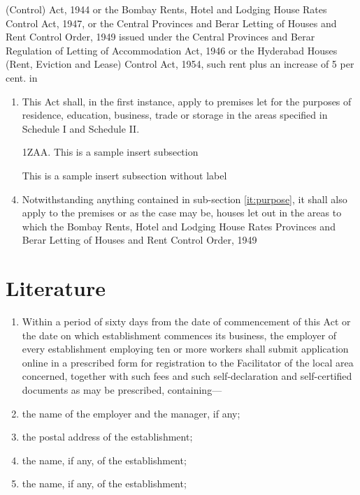 \documentclass[default]{report}
\newcommand{\ins}[1]{\underline{#1}}
\newcommand{\del}[1]{[#1]}
\newcommand{\subs}[2]{\del{#1} \ins{#2}}
\newcommand{\lblitem}[1]{%
  \def\lblnum{#1} \item
}
\newenvironment{subsectionlist}[1][99]{%
  \begin{enumerate}[label=(\emph{\protect\lblnum)}]
    \settowidth{\leftmargin}{#1}
  }{\end{enumerate}}
\begin{document}
(Control) Act, 1944 or the Bombay Rents, Hotel and Lodging House Rates
Control Act, 1947, or the Central Provinces and Berar Letting of
Houses and Rent Control Order, 1949 issued under the Central Provinces
and Berar Regulation of Letting of Accommodation Act, 1946 or the
Hyderabad Houses (Rent, Eviction and Lease) Control Act, 1954, such
rent plus an increase of 5 per cent. in
\begin{enumerate}
\item This Act shall, in the first instance, apply to premises let for
  the purposes of residence, education, business, trade or storage in
  the areas specified in Schedule I and Schedule II.
  \label{it:purpose}
\item[1ZAA.] This is a sample insert subsection

\item[] This is a sample insert subsection without label
\item Notwithstanding anything contained in sub-section
  \ref{it:purpose}, it shall
  also apply to the premises or as the case may be, houses let out in
  the areas to which the Bombay Rents, Hotel and Lodging House Rates
  Provinces and Berar Letting of Houses and Rent Control Order, 1949

\end{enumerate}

\section{Literature}
\begin{subsectionlist}
\lblitem{1} Within a period of sixty days from the date of commencement of 
this Act or the date on which establishment commences its business, the 
employer of every establishment employing ten or more workers shall submit
application online in a prescribed form for registration to the Facilitator of
the local area concerned, together with such fees and such self-declaration
and self-certified documents as may be prescribed, containing---
\lblitem{\ins{2}} the name of the employer and the manager, if any;
\lblitem{\subs{2}{3}} the postal address of the establishment;
\lblitem{\subs{3}{4}} the name, if any, of the establishment;
\lblitem{\del{4}} the name, if any, of the establishment;
\end{subsectionlist}
\end{document}
